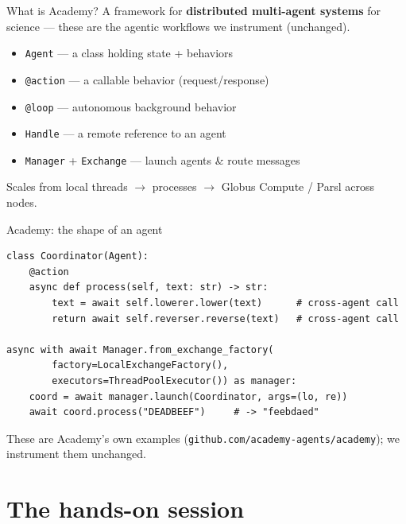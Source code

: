 \documentclass[aspectratio=169,11pt]{beamer}
\begin{document}
\begin{frame}{What is Academy?}
  A framework for \textbf{distributed multi-agent systems} for science --- these are
  the agentic workflows we instrument (unchanged).
  \begin{itemize}
    \item \texttt{Agent} --- a class holding state + behaviors
    \item \texttt{@action} --- a callable behavior (request/response)
    \item \texttt{@loop} --- autonomous background behavior
    \item \texttt{Handle} --- a remote reference to an agent
    \item \texttt{Manager} + \texttt{Exchange} --- launch agents \& route messages
  \end{itemize}
  \vspace{0.3em}
  \small Scales from local threads $\to$ processes $\to$ Globus Compute / Parsl across nodes.
\end{frame}

\begin{frame}[fragile]{Academy: the shape of an agent}
\begin{lstlisting}
class Coordinator(Agent):
    @action
    async def process(self, text: str) -> str:
        text = await self.lowerer.lower(text)      # cross-agent call
        return await self.reverser.reverse(text)   # cross-agent call

async with await Manager.from_exchange_factory(
        factory=LocalExchangeFactory(),
        executors=ThreadPoolExecutor()) as manager:
    coord = await manager.launch(Coordinator, args=(lo, re))
    await coord.process("DEADBEEF")     # -> "feebdaed"
\end{lstlisting}
  \small These are Academy's own examples
  (\texttt{github.com/academy-agents/academy}); we instrument them unchanged.
\end{frame}

\section{The hands-on session}
\end{document}
